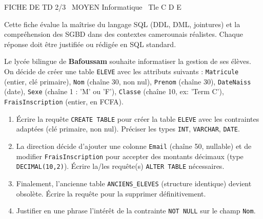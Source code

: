 \documentclass[11pt]{article}
\begin{document}
\begin{tcolorbox}[enhanced,colback=popink,colframe=popink,arc=10pt,boxrule=0pt,left=12pt,right=12pt,top=9pt,bottom=9pt]
{\color{white}\popxbold\small FICHE DE TD 2/3 \textbullet\ MOYEN \hfill Informatique \textbullet\ Tle C D E\par}
\end{tcolorbox}
\vspace{4pt}
\noindent Cette fiche évalue la maîtrise du langage SQL (DDL, DML, jointures) et la compréhension des SGBD dans des contextes camerounais réalistes. Chaque réponse doit être justifiée ou rédigée en SQL standard.

\begin{exercice}
Le lycée bilingue de \textbf{Bafoussam} souhaite informatiser la gestion de ses élèves. On décide de créer une table \texttt{ELEVE} avec les attributs suivants : \texttt{Matricule} (entier, clé primaire), \texttt{Nom} (chaîne 30, non nul), \texttt{Prenom} (chaîne 30), \texttt{DateNaiss} (date), \texttt{Sexe} (chaîne 1 : 'M' ou 'F'), \texttt{Classe} (chaîne 10, ex: 'Term C'), \texttt{FraisInscription} (entier, en FCFA).
\begin{enumerate}
    \item Écrire la requête \texttt{CREATE TABLE} pour créer la table \texttt{ELEVE} avec les contraintes adaptées (clé primaire, non nul). Préciser les types \texttt{INT}, \texttt{VARCHAR}, \texttt{DATE}.
    \item La direction décide d'ajouter une colonne \texttt{Email} (chaîne 50, nullable) et de modifier \texttt{FraisInscription} pour accepter des montants décimaux (type \texttt{DECIMAL(10,2)}). Écrire la/les requête(s) \texttt{ALTER TABLE} nécessaires.
    \item Finalement, l'ancienne table \texttt{ANCIENS\_ELEVES} (structure identique) devient obsolète. Écrire la requête pour la supprimer définitivement.
    \item Justifier en une phrase l'intérêt de la contrainte \texttt{NOT NULL} sur le champ \texttt{Nom}.
\end{enumerate}
\end{exercice}
\end{document}
